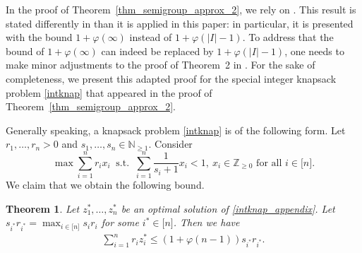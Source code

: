\documentclass[pdflatex]{sn-jnl}
\newcommand{\Z}{\mathbb{Z}}
\newcommand{\N}{\mathbb{N}}
\theoremstyle{thmstyleone}%
\newtheorem{theorem}{Theorem}%
\theoremstyle{thmstyletwo}%
\theoremstyle{thmstylethree}%
\begin{document}
	In the proof of Theorem~\ref{thm_semigroup_approx_2}, we rely on \cite[Theorem~2]{kohlikrishna1992greedyknapsack}. This result is stated differently in \cite{kohlikrishna1992greedyknapsack} than it is applied in this paper: in particular, it is presented with the bound $1+\varphi(\infty)$ instead of $1 + \varphi(|I|-1)$. To address that the bound of $1+\varphi(\infty)$ can indeed be replaced by $1 + \varphi(|I|-1)$, one needs to make minor adjustments to the proof of Theorem~2 in \cite{kohlikrishna1992greedyknapsack}. For the sake of completeness, we present this adapted proof for the special integer knapsack problem \eqref{intknap} that appeared in the proof of Theorem~\ref{thm_semigroup_approx_2}. 
	
	Generally speaking, a knapsack problem \eqref{intknap} is of the following form. Let $r_1,\ldots,r_n > 0$ and $s_1,\ldots,s_n \in \N_{\geq 1}$. Consider
	\begin{equation}\label{intknap_appendix}
		\max \sum_{i=1}^nr_ix_i \ \text{ s.t. } \ \sum_{i = 1}^n \frac{1}{s_i + 1}x_i < 1, \ x_i\in\Z_{\geq 0} \text{ for all }i\in \lbrack n\rbrack.
	\end{equation}
	We claim that we obtain the following bound. 
	
	\begin{theorem}
		\label{thm_kk_variant}
		Let $z^*_1,\ldots,z^*_n$ be an optimal solution of \eqref{intknap_appendix}. Let $s_{i^*}r_{i^*} = \max_{i\in\lbrack n\rbrack} s_ir_i$ for some $i^*\in\lbrack n\rbrack$. Then we have
		\begin{align*}
			\sum_{i=1}^n r_iz^*_i \leq (1 + \varphi(n-1))  s_{i^*}r_{i^*}.
		\end{align*}
	\end{theorem}
	
\end{document}
